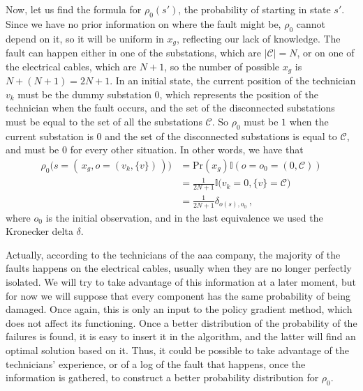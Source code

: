 Now, let us find the formula for $\rho_0(s')$, the probability of starting in state $s'$. Since we have no prior information on where the fault might be, $\rho_0$ cannot depend on it, so it will be uniform in $x_g$, reflecting our lack of knowledge. The fault can happen either in one of the substations, which are $|\mathcal C| = N$, or on one of the electrical cables, which are $N+1$, so the number of possible $x_g$ is $N + (N+1) = 2N+1$. In an initial state, the current position of the technician $v_k$ must be the dummy substation $0$, which represents the position of the technician when the fault occurs, and the set of the disconnected substations must be equal to the set of all the substations $\mathcal C$. So $\rho_0$ must be $1$ when the current substation is $0$ and the set of the disconnected substations is equal to $\mathcal C$, and must be $0$ for every other situation. In other words, we have that
\begin{equation}
    \begin{aligned}
        \rho_0 \Big(s = ( \, x_g, o =(v_k, \{v\}) \,) \Big)
        &= \text{Pr}(x_g) \mathbb I (o = o_0 = (0, \mathcal C)) \\
        &= \frac1{2N+1} \mathbb I \big( v_k = 0, \{v\} = \mathcal C \big) \\
        &= \frac1{2N+1} \delta_{o(s), o_0} \, ,
    \end{aligned}
    \label{eq:myrho}
\end{equation}
where $o_0$ is the initial observation, and in the last equivalence we used the Kronecker delta $\delta$.

Actually, according to the technicians of the \acrshort{aaa} company, the majority of the faults happens on the electrical cables, usually when they are no longer perfectly isolated. We will try to take advantage of this information at a later moment, but for now we will suppose that every component has the same probability of being damaged. Once again, this is only an input to the policy gradient method, which does not affect its functioning. Once a better distribution of the probability of the failures is found, it is easy to insert it in the algorithm, and the latter will find an optimal solution based on it. Thus, it could be possible to take advantage of the technicians' experience, or of a log of the fault that happens, once the information is gathered, to construct a better probability distribution for $\rho_0$.

